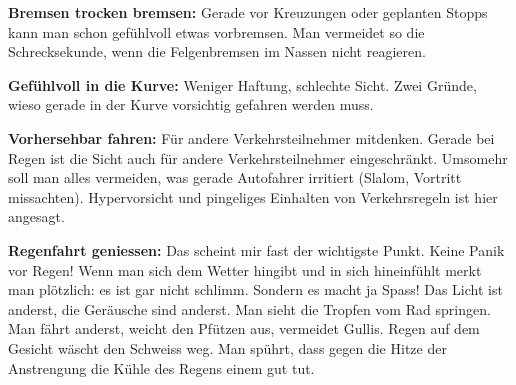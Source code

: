 \textbf{Bremsen trocken bremsen:}
Gerade vor Kreuzungen oder geplanten Stopps kann man schon gefühlvoll etwas vorbremsen.
Man vermeidet so die Schrecksekunde, wenn die Felgenbremsen im Nassen nicht reagieren.

\textbf{Gefühlvoll in die Kurve:}
Weniger Haftung, schlechte Sicht.
Zwei Gründe, wieso gerade in der Kurve vorsichtig gefahren werden muss.

\textbf{Vorhersehbar fahren:}
Für andere Verkehrsteilnehmer mitdenken.
Gerade bei Regen ist die Sicht auch für andere Verkehrsteilnehmer eingeschränkt.
Umsomehr soll man alles vermeiden, was gerade Autofahrer irritiert (Slalom, Vortritt missachten).
Hypervorsicht und pingeliges Einhalten von Verkehrsregeln ist hier angesagt.

\textbf{Regenfahrt geniessen:}
Das scheint mir fast der wichtigste Punkt.
Keine Panik vor Regen!
Wenn man sich dem Wetter hingibt und in sich hineinfühlt merkt man plötzlich: es ist gar nicht schlimm.
Sondern es macht ja Spass!
Das Licht ist anderst, die Geräusche sind anderst. Man sieht die Tropfen vom Rad springen.
Man fährt anderst, weicht den Pfützen aus, vermeidet Gullis.
Regen auf dem Gesicht wäscht den Schweiss weg.
Man spührt, dass gegen die Hitze der Anstrengung die Kühle des Regens einem gut tut.

